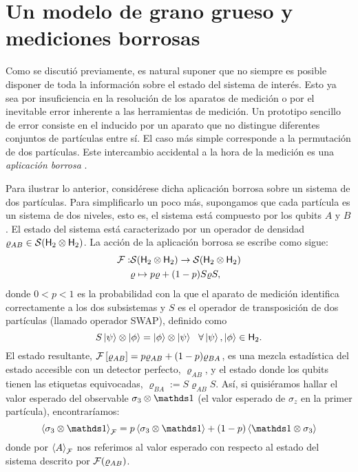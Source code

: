 \section{Un modelo de grano grueso y mediciones borrosas}\label{sec:CH2CG}


Como se discutió previamente, es natural suponer que no siempre es posible disponer de toda la información sobre el estado
 del sistema de interés. Esto ya sea por insuficiencia en la resolución de los aparatos de medición o por el inevitable error inherente a las herramientas de medición. Un prototipo sencillo de error consiste en el inducido por un aparato que no distingue diferentes conjuntos de partículas entre sí. El caso más simple corresponde a la permutación de dos partículas. Este intercambio accidental a la hora de la medición es una \textit{aplicación borrosa} \cite{FuzzyMeasurements}.

Para ilustrar lo anterior, considérese dicha aplicación borrosa sobre un sistema de dos partículas. Para simplificarlo un poco más, supongamos que cada partícula es un sistema de dos niveles, esto es, el sistema está compuesto por los qubits $A$ y $B$. El estado del sistema está caracterizado por un operador de densidad $\varrho_{AB} \in \mathcal{S}({\sf H}_2 \otimes {\sf H}_2)$. La acción de la aplicación borrosa se escribe como sigue:
\begin{align}
\mathcal{F}:&\mathcal{S}({\sf H}_2 \otimes {\sf H}_2)\to \mathcal{S}({\sf H}_2 \otimes {\sf H}_2)\nonumber\\
&\varrho \mapsto p\varrho+(1-p)S\varrho S,\nonumber
\end{align}
donde $0<p<1$ es la probabilidad con la que el aparato de medición identifica correctamente  a los dos subsistemas y $S$ es el operador de transposición de dos partículas (llamado operador SWAP), definido como 
\begin{equation}
    S\ket{\psi}\otimes \ket{\phi}=\ket{\phi}\otimes \ket{\psi} \ \ \forall \ket{\psi},\ket{\phi}\in {\sf H}_2.\nonumber
\end{equation}
El estado resultante, $\mathcal{F}\left[\varrho_{AB}\right]=p\varrho_{AB}+(1-p)\varrho_{BA}$, es una mezcla estadística del estado accesible con un detector perfecto, $\varrho_{AB}$, y el estado donde los qubits tienen las etiquetas equivocadas, $\varrho_{BA}:=S\varrho_{AB} S$. Así, si quisiéramos hallar el valor esperado del observable $\sigma_{3}\otimes\Id$ (el valor esperado de $\sigma_{z}$ en la primer partícula), encontraríamos:
\begin{equation}
    \expval{\sigma_{3}\otimes\Id}_{\mcF}=p\expval{\sigma_{3}\otimes\Id}+(1-p)\expval{\Id\otimes\sigma_{3}}\nonumber
\end{equation}
donde por $\expval{A}_{\mathcal{F}}$ nos referimos al valor esperado con respecto al estado del sistema descrito por $\mathcal{F}(\varrho_{AB})$.

